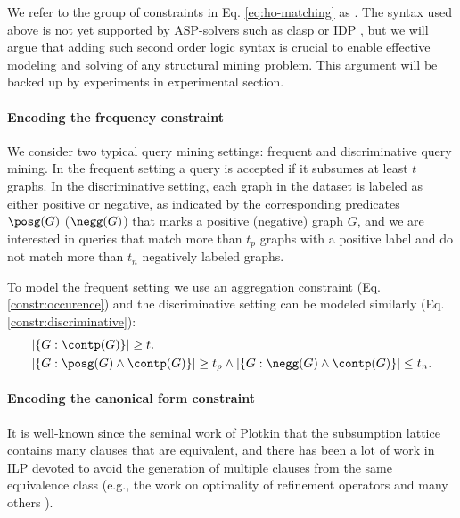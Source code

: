 We refer to the group of constraints in Eq. \ref{eq:ho-matching} as \MatchingConstraint. The syntax used above is not yet supported by ASP-solvers such as clasp \cite{clasp} or IDP \cite{idp}, but we will argue that adding such second order logic 
syntax is crucial to enable effective modeling and solving of any structural mining problem. This argument will be backed up by experiments in experimental section.


\paragraph{Encoding the frequency constraint}
We consider two typical query mining settings: frequent and discriminative query mining. In the frequent setting a query is accepted if it subsumes at least  $t$ graphs. In the discriminative setting, each graph in the dataset is labeled as either positive or negative, as indicated by the corresponding predicates $\posg(G)$ ($\negg(G)$) that marks a positive (negative) graph $G$, and we are interested in queries that match more than $t_p$ graphs with a positive label and do not match more than $t_n$ negatively labeled graphs.

To model the frequent setting we use an aggregation constraint (Eq. \ref{constr:occurence}) and the discriminative setting can be modeled similarly (Eq. \ref{constr:discriminative}):
\begin{align}
 &| \{G :\contp(G) \}| \geq t. \label{constr:occurence} \\
 &| \{G :\posg(G)  \wedge \contp(G) \}| \geq t_p \wedge |\{ G: \negg(G)  \wedge \contp(G) \}| \leq t_n.  \label{constr:discriminative}
\end{align}
\vspace{-20pt}
\paragraph{Encoding the canonical form constraint}
It is well-known since the seminal work of Plotkin \cite{plotkin} that the subsumption lattice contains many clauses that are equivalent, and there has been a lot of work in ILP devoted to avoid the generation of multiple clauses from the same equivalence class (e.g., the work on optimality of refinement operators \cite{inverseentailement} and many others \cite{refinment1,refinment2}).

